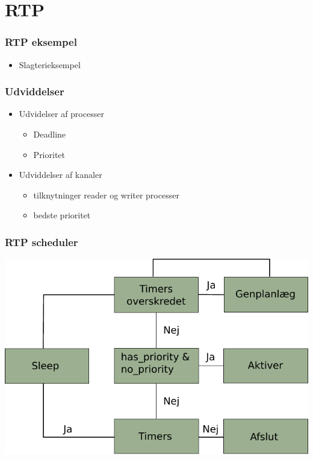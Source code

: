 \documentclass[12pt]{beamer}
\begin{document}
\section{RTP}
\begin{frame}
  \frametitle{RTP eksempel}
  \begin{itemize}   
    \item Slagterieksempel
  \end{itemize}
\end{frame}


\begin{frame}
  \frametitle{Udviddelser}
  \begin{itemize}
	\item Udvidelser af processer   
	  \begin{itemize}   
		\item Deadline
		\item Prioritet	
	  \end{itemize}
	\item Udviddelser af kanaler
	  \begin{itemize}   
		\item tilknytninger reader og writer processer
		\item bedste prioritet
	  \end{itemize}
\end{itemize}
\end{frame}


\begin{frame}
  \frametitle{RTP scheduler}
\includegraphics[scale=0.9]{rtp-scheduler} 
\end{frame}
\end{document}
